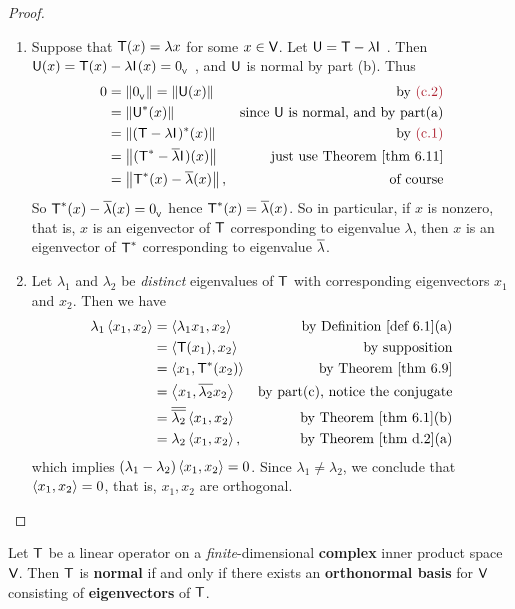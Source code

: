 \begin{proof}
\begin{enumerate}
\item Suppose that \(\textsf{T}(x) = \lambda x\) for some \(x \in \textsf{V}\).
Let \(\textsf{U} = \textsf{T} - \lambda \textsf{I}_{_{}}\) .
Then \(\textsf{U}(x) = \textsf{T}(x) - \lambda \textsf{I}_{_{}}(x) = 0_{_{\textsf{V}}}\) , and \(\textsf{U}\) is normal by part (b).
Thus
\begin{align*}
    0 & = \norm{\OV} = \norm{\U(x)} & \text{by \MAROON{(c.2)}} \\
      & = \norm{\U^*(x)} & \text{since \(\U\) is normal, and by part(a)} \\
      & = \norm{(\T - \lambda \ITRAN{})^*(x)} & \text{by \MAROON{(c.1)}} \\
      & = \norm{(\T^* - \conjugatet{\lambda} \ITRAN{})(x)} & \text{just use \THM{6.11}} \\
      & = \norm{\T^*(x) - \conjugatet{\lambda}(x)}, & \text{of course}
\end{align*}
So \(\textsf{T}^*(x) - \overline{\lambda}(x) = 0_{_{\textsf{V}}}\) hence \(\textsf{T}^*(x) = \overline{\lambda}(x)\).
So in particular, if \(x\) is nonzero, that is, \(x\) is an eigenvector of \(\textsf{T}\) corresponding to eigenvalue \(\lambda\), then \(x\) is an eigenvector of \(\textsf{T}^*\) corresponding to eigenvalue \(\overline{\lambda}\).

\item Let \(\lambda_1\) and \(\lambda_2\) be \emph{distinct} eigenvalues of \(\textsf{T}\) with corresponding eigenvectors \(x_1\) and \(x_2\).
Then we have
\begin{align*}
    \lambda_1 \LG x_1, x_2 \RG & = \LG \lambda_1 x_1, x_2 \RG & \text{by \DEF{6.1}(a)} \\
        & = \LG \T(x_1), x_2 \RG & \text{by supposition} \\
        & = \LG x_1, \T^*(x_2) \RG & \text{by \THM{6.9}} \\
        & = \LG x_1, \conjugatet{\lambda_2} x_2 \RG & \text{by part(c), notice the conjugate} \\
        & = \conjugatet{\conjugatet{\lambda_2}} \LG x_1, x_2 \RG & \text{by \THM{6.1}(b)} \\
        & = \lambda_2 \LG x_1, x_2 \RG, & \text{by \THM{d.2}(a)}
\end{align*}
which implies \((\lambda_1 - \lambda_2) \left< x_1, x_2 \right> = 0\).
Since \(\lambda_1 \ne \lambda_2\), we conclude that \(\left< x_1, x_2 \right> = 0\), that is, \(x_1, x_2\) are orthogonal.
\end{enumerate}
\end{proof}

\begin{theorem} \label{thm 6.16}
Let \(\textsf{T}\) be a linear operator on a \emph{finite}-dimensional \textbf{complex} inner product space \(\textsf{V}\).
Then \(\textsf{T}\) is \textbf{normal} if and only if there exists an
\textbf{orthonormal basis} for \(\textsf{V}\) consisting of \textbf{eigenvectors} of \(\textsf{T}\).
\end{theorem}

